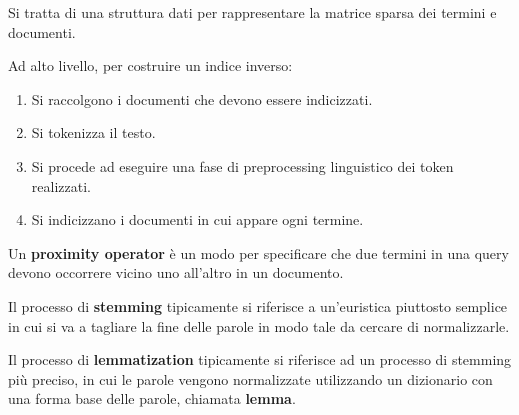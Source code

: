 \documentclass[\main/main.tex]{subfiles}
\begin{document}
\begin{multicols}{2}
\begin{definition}
    Si tratta di una struttura dati per rappresentare la matrice sparsa dei termini e documenti.
\end{definition}
\begin{observation}
    Ad alto livello, per costruire un indice inverso:
    \begin{enumerate}
        \item Si raccolgono i documenti che devono essere indicizzati.
        \item Si tokenizza il testo.
        \item Si procede ad eseguire una fase di preprocessing linguistico dei token realizzati.
        \item Si indicizzano i documenti in cui appare ogni termine.
    \end{enumerate}
\end{observation}
\begin{definition}
    Un \textbf{proximity operator} è un modo per specificare che due termini in una query devono occorrere vicino uno all'altro in un documento.
\end{definition}
\begin{definition}[Stemming]
    Il processo di \textbf{stemming} tipicamente si riferisce a un'euristica piuttosto semplice in cui si va a tagliare la fine delle parole in modo tale da cercare di normalizzarle.
\end{definition}
\begin{definition}[Lemmatization]
    Il processo di \textbf{lemmatization} tipicamente si riferisce ad un processo di stemming più preciso, in cui le parole vengono normalizzate utilizzando un dizionario con una forma base delle parole, chiamata \textbf{lemma}.
\end{definition}
\end{multicols}
\clearpage
\end{document}

